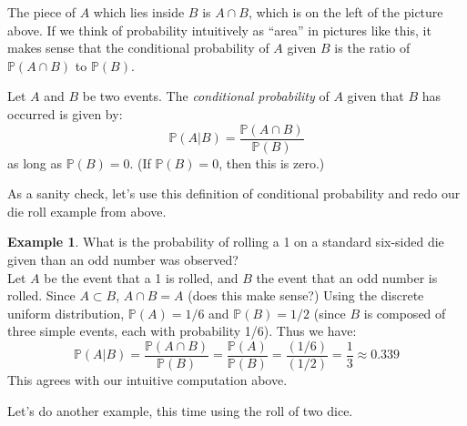 \documentclass[12pt]{article}
\theoremstyle{definition}
\newtheorem*{example}{Example}
\theoremstyle{remark}
\def\P{{\mathbb P}}
\begin{document}
The piece of $A$ which lies inside $B$ is $A \cap B$, which is on the left of the picture above. If we think of probability intuitively as ``area'' in pictures like this, it makes sense that the conditional probability of $A$ given $B$ is the ratio of $\P(A \cap B)$ to $\P(B)$.

\begin{framed}
Let $A$ and $B$ be two events. The \emph{conditional probability} of $A$ given that $B$ has occurred is given by:
\[
\P(A|B) = \frac{\P(A \cap B)}{\P(B)}
\]
as long as $\P(B) = 0$. (If $\P(B) = 0$, then this is zero.)
\end{framed}

As a sanity check, let's use this definition of conditional probability and redo our die roll example from above.

\begin{example}What is the probability of rolling a 1 on a standard six-sided die given than an odd number was observed?\\

Let $A$ be the event that a 1 is rolled, and $B$ the event that an odd number is rolled. Since $A \subset B$, $A \cap B = A$ (does this make sense?) Using the discrete uniform distribution, $\P(A) = 1/6$ and $\P(B) = 1/2$ (since $B$ is composed of three simple events, each with probability 1/6).
Thus we have:
\[
\P(A|B) = \frac{ \P(A \cap B)}{\P(B)} = \frac{\P(A)}{\P(B)} = \frac{(1/6)}{(1/2)} = \frac{1}{3} \approx 0.339
\]
This agrees with our intuitive computation above.
\end{example}

Let's do another example, this time using the roll of two dice.
\end{document}
